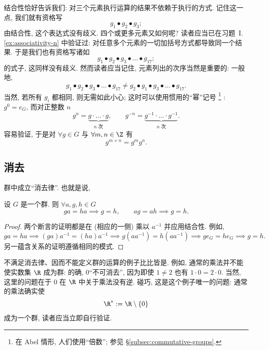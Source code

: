 结合性恰好告诉我们: 对三个元素执行运算的结果不依赖于执行的方式. 记住这一点, 我们就有资格写
\[
g_1 \bullet g_2 \bullet g_3;
\]
由结合性, 这个表达式没有歧义. 四个或更多元素又如何呢? 读者应当已在习题~I.\ref{ex:associativity-n} 中验证过: 对任意多个元素的一切加括号方式都导致同一个结果. 于是我们也有资格写诸如
\[
g_1 \bullet g_2 \bullet g_3 \bullet \dots \bullet g_{17};
\]
的式子, 这同样没有歧义. 然而读者应当记住, 元素列出的次序当然是重要的: 一般地,
\[
g_1 \bullet g_2 \bullet g_3 \bullet \dots \bullet g_{17} \neq g_2 \bullet g_1 \bullet g_3 \bullet \dots \bullet g_{17}.
\]
当然, 若所有 $g_i$ 都相同, 则无需如此小心; 这时可以使用惯用的``幂''记号%
\footnote{在 Abel 情形, 人们使用``倍数''; 参见 \S\ref{subsec:commutative-groups}.}%
: $g^0 = e_G$, 而对正整数 $n$
\[
g^n = \underbrace{g \cdot \ldots \cdot g}_{n \text{ 次}}, \qquad g^{-n} = \underbrace{g^{-1} \cdot \ldots \cdot g^{-1}}_{n \text{ 次}}.\]
容易验证, 于是对 $\forall g \in G$ 与 $\forall m, n \in \Z$ 有
\[
g^{m+n} = g^m g^n.
\]

\subsection{消去}
\label{subsec:cancellation}

群中成立``消去律''. 也就是说,

\begin{proposition}
\label{prop:cancellation}
设 $G$ 是一个群. 则 $\forall a, g, h \in G$
\[
ga = ha \implies g = h, \qquad ag = ah \implies g = h.
\]
\end{proposition}

\begin{proof}
两个断言的证明都是在 (相应的一侧) 乘以 $a^{-1}$ 并应用结合性. 例如,
\[
ga = ha \implies (ga)a^{-1} = (ha)a^{-1} \implies g(aa^{-1}) = h(aa^{-1}) \implies ge_G = he_G \implies g = h.
\]
另一蕴含关系的证明遵循相同的模式.
\end{proof}

不满足消去律、因而不能定义群的运算的例子比比皆是. 例如, 通常的乘法并不能使实数集 $\R$ 成为群: 的确, $0$``不可消去'', 因为即使 $1 \neq 2$ 也有 $1 \cdot 0 = 2 \cdot 0$. 当然, 这里的问题在于 $0$ 在 $\R$ 中关于乘法没有逆. 碰巧, 这是这个例子唯一的问题: 通常的乘法确实使
\[
\R^{*} := \R \setminus \{0\}
\]
成为一个群, 读者应当立即自行验证.

